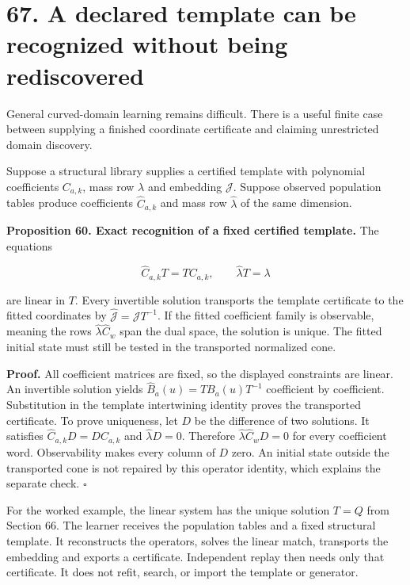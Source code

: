 \documentclass[11pt,letterpaper]{article}
\begin{document}
\section{67. A declared template can be recognized without being
rediscovered}\label{a-declared-template-can-be-recognized-without-being-rediscovered}

General curved-domain learning remains difficult. There is a useful
finite case between supplying a finished coordinate certificate and
claiming unrestricted domain discovery.

Suppose a structural library supplies a certified template with
polynomial coefficients \(C_{a,k}\), mass row \(\lambda\) and embedding
\(\mathcal J\). Suppose observed population tables produce coefficients
\(\widehat C_{a,k}\) and mass row \(\widehat\lambda\) of the same
dimension.

\textbf{Proposition 60. Exact recognition of a fixed certified
template.} The equations

\[
\boxed{
\widehat C_{a,k}T=TC_{a,k},\qquad
\widehat\lambda T=\lambda
}
\]

are linear in \(T\). Every invertible solution transports the template
certificate to the fitted coordinates by
\(\widehat{\mathcal J}=\mathcal JT^{-1}\). If the fitted coefficient
family is observable, meaning the rows \(\widehat\lambda\widehat C_w\)
span the dual space, the solution is unique. The fitted initial state
must still be tested in the transported normalized cone.

\textbf{Proof.} All coefficient matrices are fixed, so the displayed
constraints are linear. An invertible solution yields
\(\widehat B_a(u)=TB_a(u)T^{-1}\) coefficient by coefficient.
Substitution in the template intertwining identity proves the
transported certificate. To prove uniqueness, let \(D\) be the
difference of two solutions. It satisfies \(\widehat C_{a,k}D=DC_{a,k}\)
and \(\widehat\lambda D=0\). Therefore
\(\widehat\lambda\widehat C_wD=0\) for every coefficient word.
Observability makes every column of \(D\) zero. An initial state outside
the transported cone is not repaired by this operator identity, which
explains the separate check. \(\square\)

For the worked example, the linear system has the unique solution
\(T=Q\) from Section 66. The learner receives the population tables and
a fixed structural template. It reconstructs the operators, solves the
linear match, transports the embedding and exports a certificate.
Independent replay then needs only that certificate. It does not refit,
search, or import the template or generator.
\end{document}
